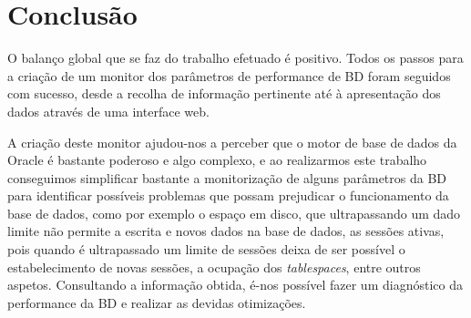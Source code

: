 \chapter*{Conclusão}

O balanço global que se faz do trabalho efetuado é positivo. Todos os passos para a criação de um monitor dos parâmetros de performance de BD foram seguidos com sucesso, desde a recolha de informação pertinente até à apresentação dos dados através de uma interface web. 

A criação deste monitor ajudou-nos a perceber que o motor de base de dados da Oracle é bastante poderoso e algo complexo, e ao realizarmos este trabalho conseguimos simplificar bastante a monitorização de alguns parâmetros da BD para identificar possíveis problemas que possam prejudicar o funcionamento da base de dados, como por exemplo o espaço em disco, que ultrapassando um dado limite não permite a escrita e novos dados na base de dados, as sessões ativas, pois quando é ultrapassado um limite de sessões deixa de ser possível o estabelecimento de novas sessões, a ocupação dos \textit{tablespaces}, entre outros aspetos. Consultando a informação obtida, é-nos possível fazer um diagnóstico da performance da BD e realizar as devidas otimizações.